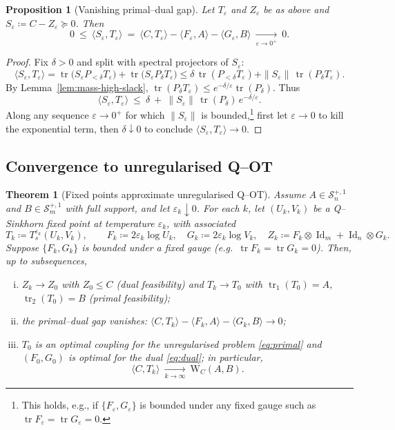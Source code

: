 \documentclass[10pt]{article}
\newcommand{\Ss}{\mathcal{S}}
\newcommand{\Id}{\operatorname{Id}}
\newcommand{\tr}{\operatorname{tr}}
\renewcommand{\epsilon}{\varepsilon}
\newcommand{\eqdef}{\coloneqq}
\providecommand{\dotp}[2]{\langle #1, #2\rangle}
\theoremstyle{plain}
\newtheorem{thm}{Theorem}
\newtheorem{prop}{Proposition}
\theoremstyle{definition}
\theoremstyle{remark}
\begin{document}
\begin{prop}[Vanishing primal--dual gap]\label{prop:gap-vanishes}
Let $T_\epsilon$ and $Z_\epsilon$ be as above and $S_\epsilon\eqdef C-Z_\epsilon\succeq0$. Then
\[
0\ \le\ \dotp{S_\epsilon}{T_\epsilon}\ =\ \dotp{C}{T_\epsilon}-\dotp{F_\epsilon}{A}-\dotp{G_\epsilon}{B}
\ \xrightarrow[\epsilon\to0^+]{}\ 0.
\]
\end{prop}

\begin{proof}
Fix $\delta>0$ and split with spectral projectors of $S_\epsilon$:
\[
\dotp{S_\epsilon}{T_\epsilon}
=\tr\!\big(S_\epsilon P_{<\delta} T_\epsilon\big)+\tr\!\big(S_\epsilon P_{\delta} T_\epsilon\big)
\le \delta\,\tr(P_{<\delta}T_\epsilon) + \|S_\epsilon\|\,\tr(P_\delta T_\epsilon).
\]
By Lemma~\ref{lem:mass-high-slack}, $\tr(P_\delta T_\epsilon)\le e^{-\delta/\epsilon}\tr(P_\delta)$. Thus
\[
\dotp{S_\epsilon}{T_\epsilon}\ \le\ \delta\ +\ \|S_\epsilon\|\,\tr(P_\delta)\,e^{-\delta/\epsilon}.
\]
Along any sequence $\epsilon\to0^+$ for which $\|S_\epsilon\|$ is bounded,\footnote{This holds, e.g., if $\{F_\epsilon,G_\epsilon\}$ is bounded under any fixed gauge such as $\tr F_\epsilon=\tr G_\epsilon=0$.} first let $\epsilon\to0$ to kill the exponential term, then $\delta\downarrow0$ to conclude $\dotp{S_\epsilon}{T_\epsilon}\to0$.
\end{proof}

\subsection*{Convergence to unregularised Q--OT}

\begin{thm}[Fixed points approximate unregularised Q--OT]\label{thm:fixed-approximate-QOT}
Assume $A\in\Ss_n^{+,1}$ and $B\in\Ss_m^{+,1}$ with full support, and let $\epsilon_k\downarrow0$.
For each $k$, let $(U_k,V_k)$ be a Q--Sinkhorn fixed point at temperature $\epsilon_k$, with associated
\[
T_k\eqdef T_s^{\epsilon_k}(U_k,V_k),\qquad
F_k\eqdef2\epsilon_k\log U_k,\quad G_k\eqdef2\epsilon_k\log V_k,\quad Z_k\eqdef F_k\otimes\Id_m+\Id_n\otimes G_k.
\]
Suppose $\{F_k,G_k\}$ is bounded under a fixed gauge (e.g.\ $\tr F_k=\tr G_k=0$). Then, up to subsequences,
\begin{enumerate}[(i)]
\item $Z_k\to Z_0$ with $Z_0\le C$ (dual feasibility) and $T_k\to T_0$ with $\tr_1(T_0)=A$, $\tr_2(T_0)=B$ (primal feasibility);
\item the primal--dual gap vanishes: $\dotp{C}{T_k}-\dotp{F_k}{A}-\dotp{G_k}{B}\to0$;
\item $T_0$ is an optimal coupling for the unregularised problem \eqref{eq:primal} and
$(F_0,G_0)$ is optimal for the dual \eqref{eq:dual}; in particular,
\[
\dotp{C}{T_k}\ \xrightarrow[k\to\infty]{}\ \mathrm{W}_C(A,B).
\]
\end{enumerate}
\end{thm}
\end{document}
